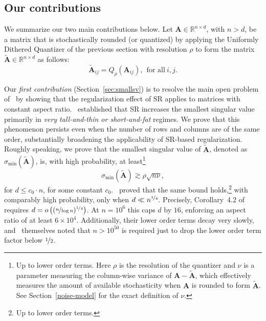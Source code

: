 \documentclass{article}
\newcommand{\Ab}{\mathbf{A}}
\newcommand{\Abtil}{\tilde{\Ab}}
\newcommand{\rbr}[1]{\left(#1\right)}
\begin{document}
\subsection{Our contributions}

We summarize our two main contributions below. Let $\Ab \in \mathbb{R}^{n \times d}$, with $n > d$, be a matrix that is stochastically rounded (or quantized) by applying the Uniformly Dithered Quantizer of the previous section with resolution $\rho$ to form the matrix $\Abtil \in \mathbb{R}^{n \times d}$ as follows:
%
\begin{equation}
    \Abtil_{ij} = Q_{\rho}(\Ab_{ij}),\ \ \text{for all}\ i,j.
\end{equation}

Our \textit{first contribution} (Section~\ref{sec:smallsv}) is to resolve the main open problem of~\cite{dexter2025stochastic} by showing that the regularization effect of SR applies to matrices with constant aspect ratio.~\cite{dexter2025stochastic} established that SR increases the smallest singular value primarily in \textit{very tall-and-thin or short-and-fat} regimes. We prove that this phenomenon persists even when the number of rows and columns are of the same order, substantially broadening the applicability of SR-based regularization. Roughly speaking, we prove that the smallest singular value of $\Abtil$, denoted as $\sigma_{\min}(\Abtil)$, is, with high probability, at least\footnote{Up to lower order terms. Here $\rho$ is the resolution of the quantizer and $\nu$ is a parameter measuring the column-wise variance of $\Ab - \Abtil$, which effectively measures the amount of available stochasticity when $\Ab$ is rounded to form $\Abtil$. See Section~\ref{noise-model} for the exact definition of $\nu$.} 
\begin{equation*}
    \sigma_{\min}(\Abtil) \gtrsim \rho \sqrt{n \nu},
\end{equation*}
for $d \leq c_0\cdot n$, for some constant $c_0$.~\cite{dexter2025stochastic} proved that the same bound holds,\footnote{Up to lower order terms.} with comparably high probability, only when $d \ll n^{\nicefrac{1}{4}}$. Precisely, Corollary~4.2 of~\citet{dexter2025stochastic} requires $d = o\rbr{(\nicefrac{n}{\log n})^{\nicefrac{1}{4}}}$. At $n = 10^6$ this caps $d$ by $16$, enforcing an aspect ratio of at least $6\times 10^4$. Additionally, their lower order terms decay very slowly, and~\citet{dexter2025stochastic} themselves noted that $n > 10^{50}$ is required just to drop the lower order term factor below $\nicefrac{1}{2}$.
\end{document}
